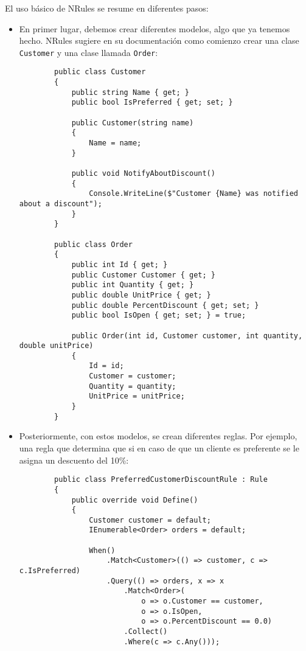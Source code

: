 El uso básico de NRules se resume en diferentes pasos:\cite{nrulesGettingStarted}
\begin{itemize}
    \item En primer lugar, debemos crear diferentes modelos, algo que ya tenemos
    hecho. NRules sugiere en su documentación como comienzo crear una clase
    \texttt{Customer} y una clase llamada \texttt{Order}:\cite{nrulesGettingStarted}
    \begin{lstlisting}
        public class Customer
        {
            public string Name { get; }
            public bool IsPreferred { get; set; }

            public Customer(string name)
            {
                Name = name;
            }

            public void NotifyAboutDiscount()
            {
                Console.WriteLine($"Customer {Name} was notified about a discount");
            }
        }

        public class Order
        {
            public int Id { get; }
            public Customer Customer { get; }
            public int Quantity { get; }
            public double UnitPrice { get; }
            public double PercentDiscount { get; set; }
            public bool IsOpen { get; set; } = true;

            public Order(int id, Customer customer, int quantity, double unitPrice)
            {
                Id = id;
                Customer = customer;
                Quantity = quantity;
                UnitPrice = unitPrice;
            }
        }
    \end{lstlisting}
    \item Posteriormente, con estos modelos, se crean diferentes reglas. Por
    ejemplo, una regla que determina que si en caso de que un cliente es
    preferente se le asigna un descuento del 10\%:\cite{nrulesGettingStarted}
    \begin{lstlisting}
        public class PreferredCustomerDiscountRule : Rule
        {
            public override void Define()
            {
                Customer customer = default;
                IEnumerable<Order> orders = default;

                When()
                    .Match<Customer>(() => customer, c => c.IsPreferred)
                    .Query(() => orders, x => x
                        .Match<Order>(
                            o => o.Customer == customer,
                            o => o.IsOpen,
                            o => o.PercentDiscount == 0.0)
                        .Collect()
                        .Where(c => c.Any()));


\end{lstlisting}
\end{itemize}
